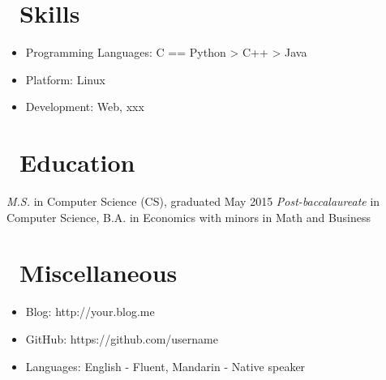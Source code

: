 \documentclass{resume}
\begin{document}
\section{\faCogs\ Skills}
\begin{itemize}[parsep=0.5ex]
  \item Programming Languages: C == Python > C++ > Java
  \item Platform: Linux
  \item Development: Web, xxx
\end{itemize}

\section{\faGraduationCap\ Education}
\textit{M.S.} in Computer Science (CS), graduated May 2015
\textit{Post-baccalaureate} in Computer Science, B.A. in Economics with minors in Math and Business

\section{\faInfo\ Miscellaneous}
\begin{itemize}[parsep=0.5ex]
  \item Blog: http://your.blog.me
  \item GitHub: https://github.com/username
  \item Languages: English - Fluent, Mandarin - Native speaker
\end{itemize}

%
%
\end{document}
